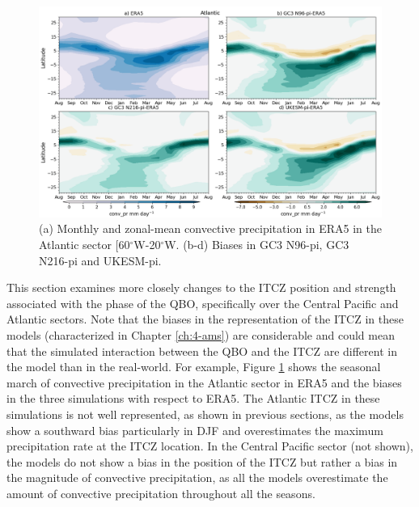 \begin{figure}[t!]
\centering
 \includegraphics[width=\linewidth]{figures/climcmip_bconv_pratl.png}
\caption[ITCZ seasonal cycle in the Atlantic Sector.]{(a) Monthly and zonal-mean convective precipitation in ERA5 in the Atlantic sector [60$^\circ$W-20$^\circ$W. (b-d) Biases in GC3 N96-pi, GC3 N216-pi and UKESM-pi. }
\label{fig:itczclimatl}
\end{figure}

This section examines more closely changes to the ITCZ position and strength associated with the phase of the QBO, specifically over the Central Pacific and Atlantic sectors. 
Note that the biases in the representation of the ITCZ in these models (characterized in Chapter \ref{ch:4-ams}) are considerable and could mean that the simulated interaction between the QBO and the ITCZ are different in the model than in the real-world. 
For example, Figure \ref{fig:itczclimatl} shows the seasonal march of convective precipitation in the Atlantic sector in ERA5 and the biases in the three simulations with respect to ERA5. The Atlantic ITCZ in these simulations is not well represented, as shown in previous sections, as the models show a southward bias particularly in DJF and overestimates the maximum precipitation rate at the ITCZ location. In the Central Pacific sector (not shown), the models do not show a bias in the position of the ITCZ but rather a bias in the magnitude of convective precipitation, as all the models overestimate the amount of convective precipitation throughout all the seasons. 
 


